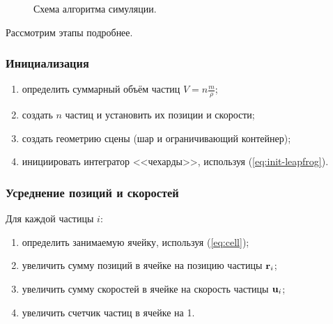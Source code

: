 \begin{figure}[h]
  \centering
  \caption{Схема алгоритма симуляции.}
  \label{fig:algorithm-simulation}
\end{figure}

Рассмотрим этапы подробнее.


\subsubsection{Инициализация}
\begin{enumerate}
  \item определить суммарный объём частиц $V=n\frac{m}{\rho}$;
  \item создать $n$ частиц и установить их позиции и скорости;
  \item создать геометрию сцены (шар и ограничивающий контейнер);
  \item инициировать интегратор <<чехарды>>, используя (\ref{eq:init-leapfrog}).
\end{enumerate}


\subsubsection{Усреднение позиций и скоростей}
Для каждой частицы $i$:
\begin{enumerate}
  \item определить занимаемую ячейку, используя (\ref{eq:cell});
  \item увеличить сумму позиций в ячейке на позицию частицы $\boldsymbol{\mathbf{r}}_i$;
  \item увеличить сумму скоростей в ячейке на скорость частицы $\boldsymbol{\mathbf{u}}_i$;
  \item увеличить счетчик частиц в ячейке на 1.
\end{enumerate}



